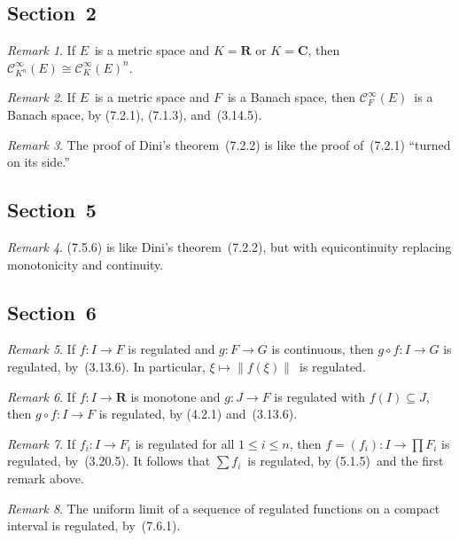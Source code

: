 \documentclass[letterpaper,12pt]{article}
\newcommand{\R}{\mathbf{R}}
\newcommand{\C}{\mathbf{C}}
\newcommand{\BC}{\mathcal{C}^{\infty}}
\newcommand{\after}{\circ}
\newcommand{\iso}{\cong}
\newcommand{\norm}[1]{\lVert{#1}\rVert}
\theoremstyle{plain}
\theoremstyle{definition}
\theoremstyle{remark}
\newtheorem*{rmk}{Remark}
\begin{document}
\subsection*{Section~2}
\begin{rmk}
If \(E\)~is a metric space and \(K=\R\) or \(K=\C\), then \(\BC_{K^n}(E)\iso\BC_K(E)^n\).
\end{rmk}

\begin{rmk}
If \(E\)~is a metric space and \(F\)~is a Banach space, then \(\BC_F(E)\)~is a Banach space, by (7.2.1), (7.1.3), and~(3.14.5).
\end{rmk}

\begin{rmk}
The proof of Dini's theorem~(7.2.2) is like the proof of~(7.2.1) ``turned on its side.''
\end{rmk}

\subsection*{Section~5}
\begin{rmk}
(7.5.6) is like Dini's theorem~(7.2.2), but with equicontinuity replacing monotonicity and continuity.
\end{rmk}

\subsection*{Section~6}
\begin{rmk}
If \(f:I\to F\) is regulated and \(g:F\to G\) is continuous, then \(g\after f:I\to G\) is regulated, by~(3.13.6). In particular, \(\xi\mapsto\norm{f(\xi)}\)~is regulated.
\end{rmk}

\begin{rmk}
If \(f:I\to\R\) is monotone and \(g:J\to F\) is regulated with \(f(I)\subseteq J\), then \(g\after f:I\to F\) is regulated, by (4.2.1) and~(3.13.6).
\end{rmk}

\begin{rmk}
If \(f_i:I\to F_i\) is regulated for all \(1\le i\le n\), then \(f=(f_i):I\to\prod F_i\) is regulated, by~(3.20.5). It follows that \(\sum f_i\)~is regulated, by (5.1.5)~and the first remark above.
\end{rmk}

\begin{rmk}
The uniform limit of a sequence of regulated functions on a compact interval is regulated, by~(7.6.1).
\end{rmk}
\end{document}

